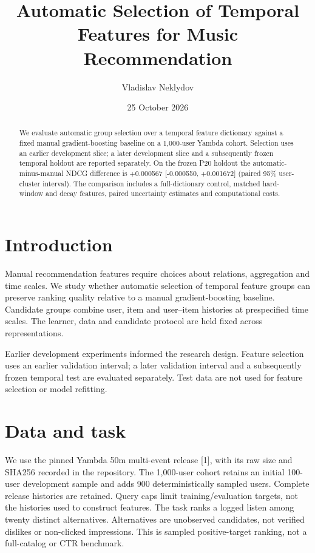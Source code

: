 \documentclass[10pt,a4paper]{article}
\title{Automatic Selection of Temporal Features for Music Recommendation}
\author{Vladislav Neklydov}\date{25 October 2026}
\begin{document}
\maketitle


\begin{abstract}
We evaluate automatic group selection over a temporal feature dictionary
against a fixed manual gradient-boosting baseline on a 1,000-user Yambda cohort.
Selection uses an earlier development slice; a later development slice and
a subsequently frozen temporal holdout are reported separately.
On the frozen P20 holdout the automatic-minus-manual NDCG difference is +0.000567 [-0.000550, +0.001672] (paired 95\% user-cluster interval).
The comparison includes a full-dictionary control, matched hard-window and
decay features, paired uncertainty estimates and computational costs.
\end{abstract}
\section{Introduction}
Manual recommendation features require choices about relations, aggregation
and time scales. We study whether automatic selection of temporal feature
groups can preserve ranking quality relative to a manual gradient-boosting
baseline. Candidate groups combine user, item and user--item histories at
prespecified time scales. The learner, data and candidate protocol are held
fixed across representations.

Earlier development experiments informed the research design. Feature selection
uses an earlier validation interval; a later validation interval and a
subsequently frozen temporal test are evaluated separately. Test data are not
used for feature selection or model refitting.

\section{Data and task}
We use the pinned Yambda 50m multi-event release [1], with its raw size and
SHA256 recorded in the repository. The 1,000-user cohort retains an initial 100-user development sample and
adds 900 deterministically sampled users. Complete release histories are retained. Query caps limit
training/evaluation targets, not the histories used to construct features.
The task ranks a logged listen among twenty distinct alternatives. Alternatives
are unobserved candidates, not verified dislikes or non-clicked impressions.
This is sampled positive-target ranking, not a full-catalog or CTR benchmark.
\end{document}
